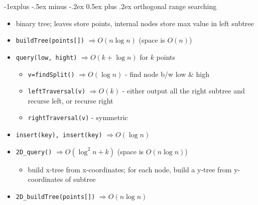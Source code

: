 \documentclass[10pt]{article}
\makeatletter
\renewcommand{\subsection}{\@startsection{subsection}{2}{0mm}%
                                {-1explus -.5ex minus -.2ex}%
                                {0.5ex plus .2ex}%
                                {\normalfont\normalsize\bfseries}}
\let\Then\Rightarrow
\newcommand{\code}[1]{\textcolor{mygreen}{\texttt{#1}}}
\makeatother
\begin{document}
\begin{multicols}{3}
\subsection{orthogonal range searching}
\begin{itemize}
    \item binary tree; leaves store points, internal nodes store max value in left subtree
    \item \code{buildTree(points[])} $\Then O(n \log n)$ \quad (space is $O(n)$)
    \item \code{query(low, hight)} $\Then O(k + \log n)$ for $k$ points
    \begin{itemize}
        \item \code{v=findSplit()} $\Then O(\log n)$ - find node b/w low \& high
        \item \code{leftTraversal(v)} $\Then O(k)$ - either output all the right subtree and recurse left, or recurse right 
        \item \code{rightTraversal(v)} - symmetric
    \end{itemize}
    \item \code{insert(key), insert(key)} $\Then O(\log n)$ 
    \item \code{2D\_query()} $\Then O(\log^2n + k)$ \quad (space is $O(n \log n)$)
    \begin{itemize}
        \item build x-tree from x-coordinates; for each node, build a y-tree from y-coordinates of subtree
    \end{itemize}
    \item \code{2D\_buildTree(points[])} $\Then O(n \log n)$
\end{itemize}


\end{multicols}
\end{document}
